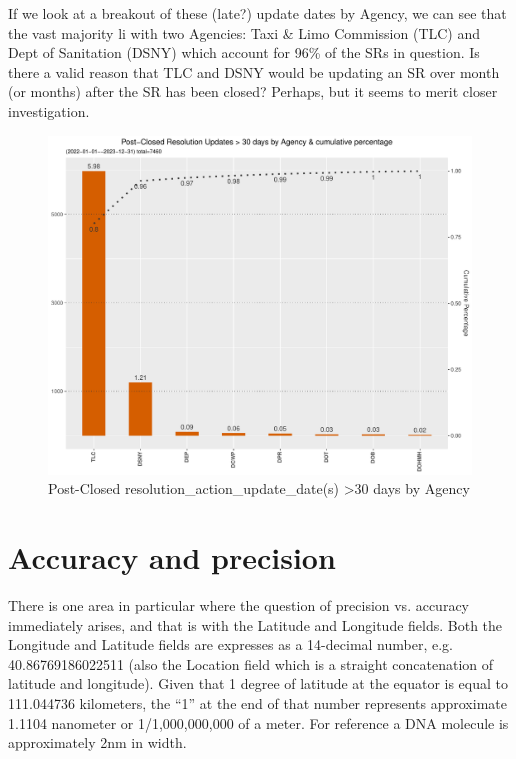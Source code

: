 \documentclass[12pt, titlepage]{article}
\begin{document}
	If we look at a breakout of these (late?) update dates by Agency, 
	we can see that the vast majority li with two Agencies: Taxi \& Limo 
	Commission (TLC) and Dept of Sanitation (DSNY) which account 
	for 96\% of the SRs in question.  Is there a valid reason that TLC and 
	DSNY would be updating an SR over month (or months) after 
	the SR has been closed? Perhaps, but it seems to merit closer investigation. 

	\begin{figure}[tbp]
		\centering
		\includegraphics[width = \textwidth]{postClosedBarChart.pdf}
		\caption{Post-Closed resolution\_action\_update\_date(s) 
		\textgreater30 days by Agency}
		\label{fig:resolution-by-agency}
	\end{figure}		



\section{Accuracy and precision}
\label{sec:precision}
There is one area in particular where the question of precision vs. 
accuracy immediately arises, and that is with the Latitude and Longitude 
fields. Both the Longitude and Latitude fields are expresses as a 14-decimal 
number, e.g. 40.86769186022511 (also the Location field which is a 
straight concatenation of latitude and longitude). Given that 1 
degree of latitude at the equator is equal to 111.044736 kilometers, 
the ``1'' at the end of that number represents approximate 1.1104 nanometer 
or 1/1,000,000,000 of a meter. For reference a DNA molecule is 
approximately 2nm in width. 
\end{document}

